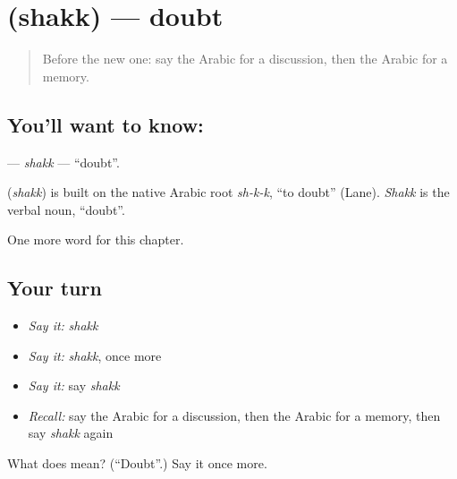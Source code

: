 \section[\texorpdfstring{\ar{شك} (shakk)}{شك (shakk)}]{ (shakk) — doubt}

\label{lesson:AR-C239-shakk}



\begin{quote}
Before the new one: say the Arabic for a discussion, then the Arabic for a memory.
\end{quote}

\subsection*{You'll want to know: }
\textbf{} — \emph{shakk} — \textquotedblleft{}doubt\textquotedblright{}.

\begin{cousinweb}
\textbf{} (\emph{shakk}) is built on the native Arabic root \emph{sh-k-k}, \textquotedblleft{}to doubt\textquotedblright{} (Lane). \emph{Shakk} is the verbal noun, \textquotedblleft{}doubt\textquotedblright{}.
\end{cousinweb}

\begin{grammarlens}[title={What you've built}]
One more word for this chapter.
\end{grammarlens}

\subsection*{Your turn}
\begin{itemize}
\raggedright
  \item \emph{Say it:} \emph{shakk}
  \item \emph{Say it:} \emph{shakk}, once more
  \item \emph{Say it:} say \emph{shakk}
  \item \emph{Recall:} say the Arabic for a discussion, then the Arabic for a memory, then say \emph{shakk} again
\end{itemize}

\begin{tcolorbox}[breakable,colback=teal!4,colframe=teal!35!black,title={Before you move on}]
What does  mean? (\textquotedblleft{}Doubt\textquotedblright{}.) Say it once more.
\end{tcolorbox}
